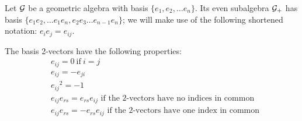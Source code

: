 \begin{lemma}
	Let $\mathcal{G}$ be a geometric algebra with basis $\{e_1, e_2, \ldots e_n\}$.
	Its even subalgebra $\mathcal{G}_+$ has basis $\{e_1e_2, \ldots e_1e_n, e_2e_3 \ldots e_{n-1}e_n\}$; we will make use of the following shortened notation: $e_ie_j = e_{ij}$.

	The basis 2-vectors have the following properties:
	\begin{align*}
		&e_{ij} = 0\ \mathrm{if}\ i=j \\
		&e_{ij} = -e_{ji} \\
		&{e_{ij}}^2 = -1 \\
		&e_{ij}e_{rs} = e_{rs}e_{ij} \text{ if the 2-vectors have no indices in common} \\
		&e_{ij}e_{rs} = -e_{rs}e_{ij} \text{ if the 2-vectors have one index in common}
	\end{align*}
\end{lemma}
